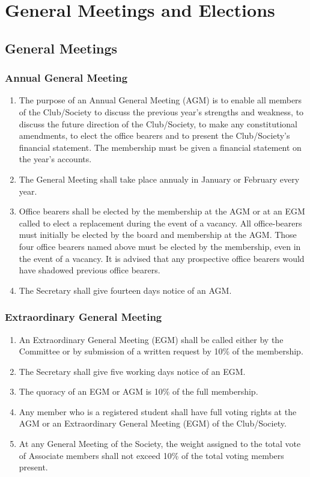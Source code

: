 \documentclass{report}
\newcommand{\bearersNo}{four}
\begin{document}
\chapter{General Meetings and Elections}


\section{General Meetings}
	\subsection{Annual General Meeting}
		\begin{enumerate}
			\item{The purpose of an Annual General Meeting (AGM) is to enable all members of the Club/Society to discuss the previous year’s strengths and weakness, to discuss the future direction of the Club/Society, to make any constitutional amendments, to elect the office bearers and to present the Club/Society’s financial statement. The membership must be given a financial statement on the year’s accounts. }
			\item{The General Meeting shall take place annualy in January or February every year.}
			\item{Office bearers shall be elected by the membership at the AGM or at an EGM called to elect a replacement during the event of a vacancy. All office-bearers must initially be elected by the board and membership at the AGM. Those \bearersNo{} office bearers named above must be elected by the membership, even in the event of a vacancy. It is advised that any prospective office bearers would have shadowed previous office bearers.}
			\item{The Secretary shall give fourteen days notice of an AGM.}
		\end{enumerate}
	\subsection{Extraordinary General Meeting}
		\begin{enumerate}
			\item{An Extraordinary General Meeting (EGM) shall be called either by the Committee or by submission of a written request by 10\% of the membership. }
			\item{The Secretary shall give five working days notice of an EGM.}
			\item{The quoracy of an EGM or AGM is 10\% of the full membership.}
			\item{Any member who is a registered student shall have full voting rights at the AGM or an Extraordinary General Meeting (EGM) of the Club/Society.}
			\item{At any General Meeting of the Society, the weight assigned to the total vote of Associate members shall not exceed 10\% of the total voting members present.}
		\end{enumerate}
\end{document}
